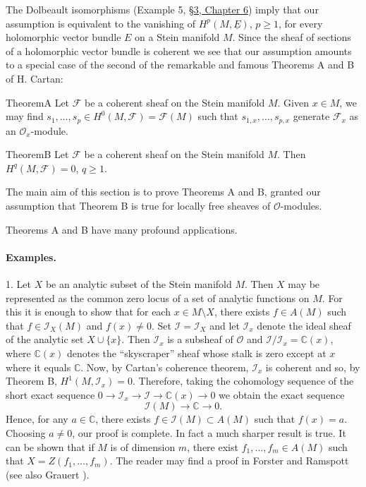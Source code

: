 The Dolbeault isomorphisms (Example 5, \hyperref[sec:6:3]{\S3, Chapter 6}) imply that our assumption is equivalent to the vanishing of $H^p(M,\underline E)$, $p\geq1$, for every holomorphic vector bundle $E$ on a Stein manifold $M$. Since the sheaf of sections of a holomorphic vector bundle is coherent we see that our assumption amounts to a special case of the second of the remarkable and famous Theorems A and B of H. Cartan:
\begin{originaltheorem}{Theorem}{A}
Let $\mathcal{F}$ be a coherent sheaf on the Stein manifold $M$. Given $x\in M$, we may find $s_1,\ldots,s_p\in H^0(M,\mathcal{F})=\mathcal{F}(M)$ such that $s_{1,x},\ldots,s_{p,x}$ generate $\mathcal{F}_x$ as an $\mathcal{O}_x$-module.
\end{originaltheorem}
\begin{originaltheorem}{Theorem}{B}
Let $\mathcal{F}$ be a coherent sheaf on the Stein manifold $M$. Then $H^q(M,\mathcal{F})=0$, $q\geq1$.
\end{originaltheorem}
The main aim of this section is to prove Theorems A and B, granted our assumption that Theorem B is true for locally free sheaves of $\mathcal{O}$-modules.

Theorems A and B have many profound applications.
\paragraph{Examples.}
1. Let $X$ be an analytic subset of the Stein manifold $M$. Then $X$ may be represented as the common zero locus of a set of analytic functions on $M$. For this it is enough to show that for each $x\in M\setminus X$, there exists $f\in A(M)$ such that $f\in\mathcal{I}_X(M)$ and $f(x)\neq0$. Set $\mathcal{I}=\mathcal{I}_X$ and let $\mathcal{I}_x$ denote the ideal sheaf of the analytic set $X\cup\{x\}$. Then $\mathcal{I}_x$ is a subsheaf of $\mathcal{O}$ and $\mathcal{I}/\mathcal{I}_x=\mathbb{C}(x)$, where $\mathbb{C}(x)$ denotes the ``skyscraper'' sheaf whose stalk is zero except at $x$ where it equals $\mathbb{C}$. Now, by Cartan's coherence theorem, $\mathcal{I}_x$ is coherent and so, by Theorem B, $H^1(M,\mathcal{I}_x)=0$. Therefore, taking the cohomology sequence of the short exact sequence $0\to\mathcal{I}_x\to\mathcal{I}\to\mathbb{C}(x)\to0$ we obtain the exact sequence
\[
\mathcal{I}(M)\to\mathbb{C}\to0.
\]
Hence, for any $a\in\mathbb{C}$, there exists $f\in\mathcal{I}(M)\subset A(M)$ such that $f(x)=a$. Choosing $a\neq0$, our proof is complete. In fact a much sharper result is true. It can be shown that if $M$ is of dimension $m$, there exist $f_1,\ldots,f_m\in A(M)$ such that $X=Z(f_1,\ldots,f_m)$. The reader may find a proof in Forster and Ramspott \cite{bib:II:forster-o-and-ramspott-k-j:1} (see also Grauert \cite{bib:II:grauert-h:2}).

